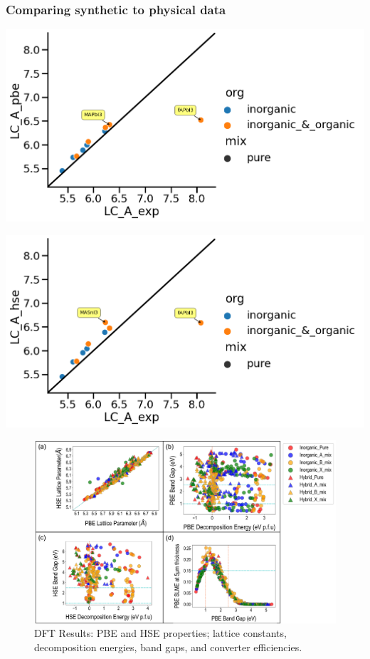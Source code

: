 \documentclass[twoside, twocolumn, 9pt, draft]{article}
\begin{document}
\subsubsection*{Comparing synthetic to physical data}
\label{sec:org923b673}
\begin{center}
\includegraphics[width=.9\linewidth]{./expval/pbe_v_exp_LC.png}
\end{center}

\begin{center}
\includegraphics[width=.9\linewidth]{./expval/hse_v_exp_LC.png}
\end{center}

\begin{figure}[h]
\centering
\includegraphics[width=.9\linewidth]{./figs/screening_properties.png}
\caption{\label{fig:pairplots} DFT Results: PBE and HSE properties; lattice constants, decomposition energies, band gaps, and converter efficiencies.}
\end{figure}
\end{document}
